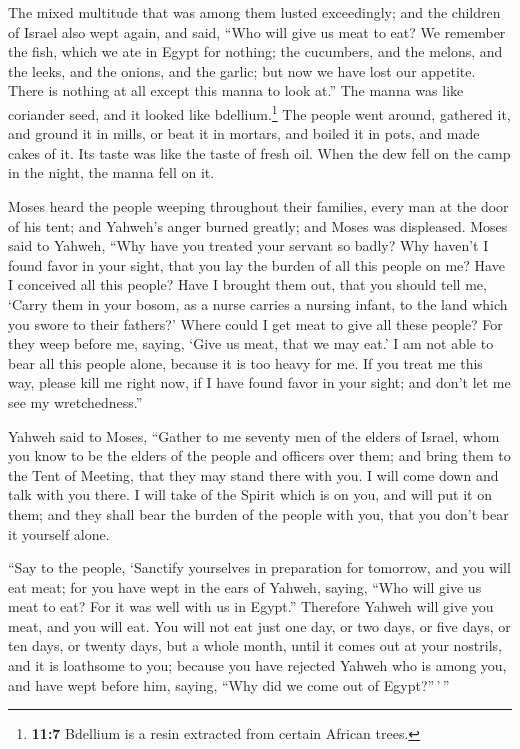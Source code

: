  The mixed multitude that was among them lusted
exceedingly; and the children of Israel also wept again, and said, ``Who
will give us meat to eat?  We remember the fish, which we
ate in Egypt for nothing; the cucumbers, and the melons, and the leeks,
and the onions, and the garlic;  but now we have lost our
appetite. There is nothing at all except this manna to look at.''
 The manna was like coriander seed, and it looked like
bdellium.\footnote{\textbf{11:7} Bdellium is a resin extracted from
  certain African trees.}  The people went around,
gathered it, and ground it in mills, or beat it in mortars, and boiled
it in pots, and made cakes of it. Its taste was like the taste of fresh
oil.  When the dew fell on the camp in the night, the
manna fell on it.

 Moses heard the people weeping throughout their
families, every man at the door of his tent; and Yahweh's anger burned
greatly; and Moses was displeased.  Moses said to Yahweh,
``Why have you treated your servant so badly? Why haven't I found favor
in your sight, that you lay the burden of all this people on me?
 Have I conceived all this people? Have I brought them
out, that you should tell me, `Carry them in your bosom, as a nurse
carries a nursing infant, to the land which you swore to their fathers?'
 Where could I get meat to give all these people? For
they weep before me, saying, `Give us meat, that we may eat.'
 I am not able to bear all this people alone, because it
is too heavy for me.  If you treat me this way, please
kill me right now, if I have found favor in your sight; and don't let me
see my wretchedness.''

 Yahweh said to Moses, ``Gather to me seventy men of the
elders of Israel, whom you know to be the elders of the people and
officers over them; and bring them to the Tent of Meeting, that they may
stand there with you.  I will come down and talk with you
there. I will take of the Spirit which is on you, and will put it on
them; and they shall bear the burden of the people with you, that you
don't bear it yourself alone.

 ``Say to the people, `Sanctify yourselves in preparation
for tomorrow, and you will eat meat; for you have wept in the ears of
Yahweh, saying, ``Who will give us meat to eat? For it was well with us
in Egypt.'' Therefore Yahweh will give you meat, and you will eat.
 You will not eat just one day, or two days, or five
days, or ten days, or twenty days,  but a whole month,
until it comes out at your nostrils, and it is loathsome to you; because
you have rejected Yahweh who is among you, and have wept before him,
saying, ``Why did we come out of Egypt?''\,'\,''

